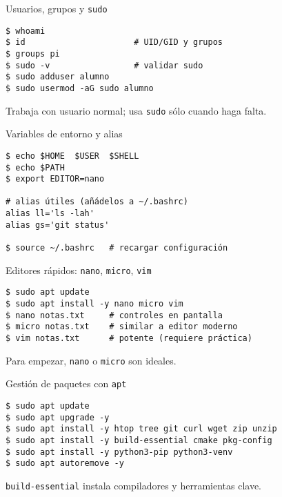 \documentclass[aspectratio=169,professionalfonts]{beamer}
\begin{document}
\begin{frame}[fragile]{Usuarios, grupos y \texttt{sudo}}
\begin{verbatim}
$ whoami
$ id                      # UID/GID y grupos
$ groups pi
$ sudo -v                 # validar sudo
$ sudo adduser alumno
$ sudo usermod -aG sudo alumno
\end{verbatim}
\begin{infobox}
Trabaja con usuario normal; usa \texttt{sudo} sólo cuando haga falta.
\end{infobox}
\end{frame}

\begin{frame}[fragile]{Variables de entorno y alias}
\begin{verbatim}
$ echo $HOME  $USER  $SHELL
$ echo $PATH
$ export EDITOR=nano

# alias útiles (añádelos a ~/.bashrc)
alias ll='ls -lah'
alias gs='git status'

$ source ~/.bashrc   # recargar configuración
\end{verbatim}
\end{frame}

\begin{frame}[fragile]{Editores rápidos: \texttt{nano}, \texttt{micro}, \texttt{vim}}
\begin{verbatim}
$ sudo apt update
$ sudo apt install -y nano micro vim
$ nano notas.txt     # controles en pantalla
$ micro notas.txt    # similar a editor moderno
$ vim notas.txt      # potente (requiere práctica)
\end{verbatim}
\begin{infobox}
Para empezar, \texttt{nano} o \texttt{micro} son ideales.
\end{infobox}
\end{frame}

\begin{frame}[fragile]{Gestión de paquetes con \texttt{apt}}
\begin{verbatim}
$ sudo apt update
$ sudo apt upgrade -y
$ sudo apt install -y htop tree git curl wget zip unzip
$ sudo apt install -y build-essential cmake pkg-config
$ sudo apt install -y python3-pip python3-venv
$ sudo apt autoremove -y
\end{verbatim}
\begin{infobox}
\texttt{build-essential} instala compiladores y herramientas clave.
\end{infobox}
\end{frame}
\end{document}
